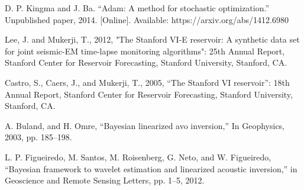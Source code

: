 \documentclass[journal]{IEEEtran}
\begin{document}
\begin{thebibliography}{1}
D. P. Kingma and J. Ba. “Adam: A method for stochastic optimization.” Unpublished paper, 2014. [Online]. Available: https://arxiv.org/abs/1412.6980

Lee, J. and Mukerji, T., 2012, "The Stanford VI-E reservoir: A synthetic data set for joint seismic-EM time-lapse monitoring algorithms": 25th Annual Report, Stanford Center for Reservoir Forecasting, Stanford University, Stanford, CA.

Castro, S., Caers, J., and Mukerji, T., 2005, “The Stanford VI reservoir”: 18th Annual Report, Stanford Center for Reservoir Forecasting, Stanford University, Stanford, CA.

A. Buland,  and H. Omre, ``Bayesian linearized avo inversion,'' In Geophysics, 2003, pp. 185--198.

L. P. Figueiredo, M. Santos, M. Roisenberg, G. Neto, and W. Figueiredo, ``Bayesian framework to wavelet estimation and linearized acoustic inversion,'' in Geoscience and Remote Sensing Letters, pp. 1--5, 2012.

\end{thebibliography}




\end{document}

